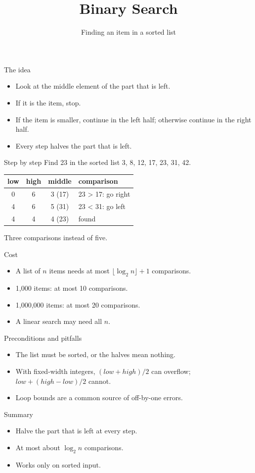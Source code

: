 \documentclass[aspectratio=169,11pt]{beamer}
\title{Binary Search}
\subtitle{Finding an item in a sorted list}
\date{}
\begin{document}
\begin{frame}
  \titlepage
\end{frame}

\begin{frame}{The idea}
  \begin{itemize}
    \item Look at the middle element of the part that is left.
    \item If it is the item, stop.
    \item If the item is smaller, continue in the left half;
          otherwise continue in the right half.
    \item Every step halves the part that is left.
  \end{itemize}
\end{frame}

\begin{frame}{Step by step}
  Find 23 in the sorted list 3, 8, 12, 17, 23, 31, 42.
  \medskip
  \begin{center}
  \begin{tabular}{@{}cccl@{}}
    \toprule
    low & high & middle & comparison \\
    \midrule
    0 & 6 & 3 (17) & 23 > 17: go right \\
    4 & 6 & 5 (31) & 23 < 31: go left \\
    4 & 4 & 4 (23) & found \\
    \bottomrule
  \end{tabular}
  \end{center}
  \medskip
  Three comparisons instead of five.
\end{frame}

\begin{frame}{Cost}
  \begin{itemize}
    \item A list of $n$ items needs at most $\lfloor \log_2 n \rfloor + 1$ comparisons.
    \item 1,000 items: at most 10 comparisons.
    \item 1,000,000 items: at most 20 comparisons.
    \item A linear search may need all $n$.
  \end{itemize}
\end{frame}

\begin{frame}{Preconditions and pitfalls}
  \begin{itemize}
    \item The list must be sorted, or the halves mean nothing.
    \item With fixed-width integers, $(\mathit{low} + \mathit{high})/2$ can overflow;
          $\mathit{low} + (\mathit{high} - \mathit{low})/2$ cannot.
    \item Loop bounds are a common source of off-by-one errors.
  \end{itemize}
\end{frame}

\begin{frame}{Summary}
  \begin{itemize}
    \item Halve the part that is left at every step.
    \item At most about $\log_2 n$ comparisons.
    \item Works only on sorted input.
  \end{itemize}
\end{frame}
\end{document}
